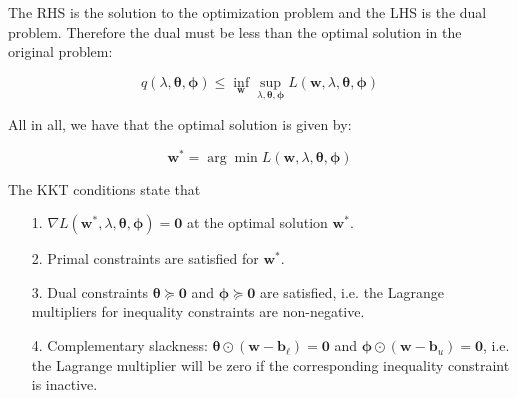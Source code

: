 \documentclass{beamer}
\begin{document}
\begin{frame}

\justifying
The RHS is the solution to the optimization problem and the LHS is the dual problem. Therefore the dual must be less than the optimal solution in the original problem:

\justifying
\begin{equation*}
	q \left(\lambda, \boldsymbol\theta, \boldsymbol\phi \right) \leq \inf_{\mathbf{w}} \sup_{\lambda, \boldsymbol\theta, \boldsymbol\phi} L\left(\mathbf{w},\lambda,\boldsymbol\theta,\boldsymbol\phi\right)
\end{equation*}

\vspace{0.2cm}
\justifying
All in all, we have that the optimal solution is given by:

\justifying
\begin{equation*}
	\mathbf{w}^{*} = \arg \min L\left(\mathbf{w},\lambda,\boldsymbol\theta,\boldsymbol\phi\right)
\end{equation*}

\end{frame}





\begin{frame}

\justifying
The KKT conditions state that

\vspace{0.2cm}
\justifying
\begin{itemize}
	\item[1.] $\nabla L\left(\mathbf{w}^{*},\lambda,\boldsymbol\theta,\boldsymbol\phi\right) = \mathbf{0}$ at the optimal solution $\mathbf{w}^{*}$.
	\item[2.] Primal constraints are satisfied for $\mathbf{w}^{*}$.
	\item[3.] Dual constraints $\boldsymbol\theta \succcurlyeq \mathbf{0}$ and $\boldsymbol\phi \succcurlyeq \mathbf{0}$ are satisfied, i.e. the Lagrange multipliers for inequality constraints are non-negative.
	\item[4.] Complementary slackness: $\boldsymbol\theta \odot \left( \mathbf{w}-\mathbf{b}_{\ell} \right) = \mathbf{0}$ and $\boldsymbol\phi \odot \left( \mathbf{w}-\mathbf{b}_{u} \right) = \mathbf{0}$,  i.e. the Lagrange multiplier will be zero if the corresponding inequality constraint is inactive.
\end{itemize}

\end{frame}
\end{document}
